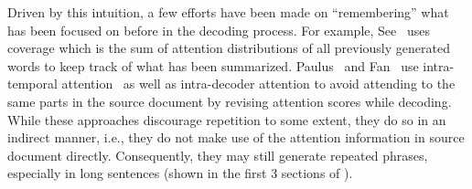 Driven by this intuition, a few efforts have been made on ``remembering''
what has been focused on before in the decoding process. 
For example, See~ 
uses coverage 
which is the sum of
attention distributions of all previously generated words to keep track of 
what has been summarized.  Paulus~ and 
Fan~ use intra-temporal 
attention~\cite{NallapatiZSGX16} as well as intra-decoder attention to avoid 
attending to the same parts in the source document by 
revising attention scores while decoding. 
While these approaches discourage repetition to some extent,
they do so in an indirect manner, i.e., they do not 
make use of the attention information in source document directly.
Consequently, they may still generate repeated phrases, 
especially in long sentences (shown in the first 3 sections of
).

